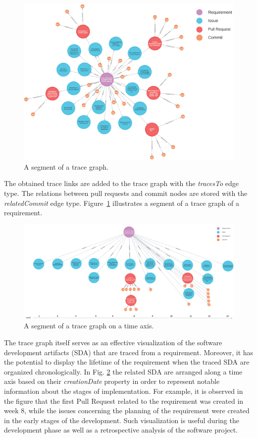 \begin{figure}[htb]
    \centering
    \includegraphics[width=1\linewidth]{figs/rawTraceGraph.png}
    \caption{A segment of a trace graph.}
    \label{fig:rawtracegraph}
  \end{figure}

  The obtained trace links are added to the trace graph with the \emph{tracesTo} edge type. 
  The relations between pull requests and commit nodes are stored with the \emph{relatedCommit} edge type.
  Figure~\ref{fig:rawtracegraph} illustrates a segment of a trace graph of a requirement.

\begin{figure}[htb]
    \centering
    \includegraphics[width=.99\linewidth]{figs/traceGraph.png}
    \caption{A segment of a trace graph on a time axis.}
    \label{fig:tracegraph}
\end{figure}

The trace graph itself serves as an effective visualization of the software development artifacts (SDA) that are traced from a requirement. Moreover, it has the potential to display the lifetime of the requirement when the traced SDA are organized chronologically. In Fig. \ref{fig:tracegraph} the related SDA are arranged along a time axis based on their \textit{creationDate} property in order to represent notable information about the stages of implementation. 
For example, it is observed in the figure that the first Pull Request related to the requirement was created in week 8, while the issues concerning the planning of the requirement were created in the early stages of the development. Such visualization is useful during the development phase as well as a retrospective analysis of the software project.




